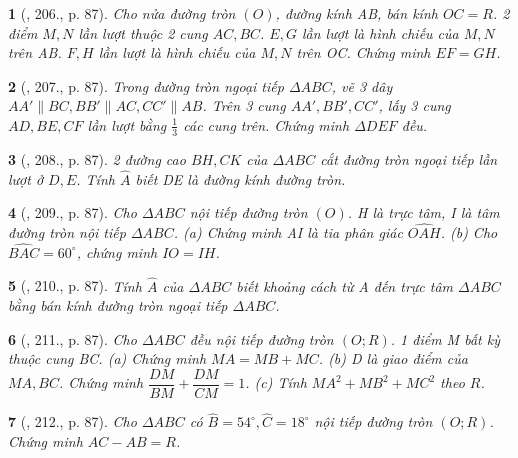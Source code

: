 \documentclass{article}
\newtheorem{baitoan}{}
\begin{document}
\begin{baitoan}[\cite{Binh_Toan_9_tap_2}, 206., p. 87]
	Cho nửa đường tròn $(O)$, đường kính AB, bán kính $OC = R$. 2 điểm $M,N$ lần lượt thuộc 2 cung $AC,BC$. $E,G$ lần lượt là hình chiếu của $M,N$ trên AB. $F,H$ lần lượt là hình chiếu của $M,N$ trên OC. Chứng minh $EF = GH$.
\end{baitoan}

\begin{baitoan}[\cite{Binh_Toan_9_tap_2}, 207., p. 87]
	Trong đường tròn ngoại tiếp $\Delta ABC$, vẽ 3 dây $AA'\parallel BC,BB'\parallel AC,CC'\parallel AB$. Trên 3 cung $AA',BB',CC'$, lấy 3 cung $AD,BE,CF$ lần lượt bằng $\frac{1}{3}$ các cung trên. Chứng minh $\Delta DEF$ đều.
\end{baitoan}

\begin{baitoan}[\cite{Binh_Toan_9_tap_2}, 208., p. 87]
	2 đường cao $BH,CK$ của $\Delta ABC$ cắt đường tròn ngoại tiếp lần lượt ở $D,E$. Tính $\widehat{A}$ biết DE là đường kính đường tròn.
\end{baitoan}

\begin{baitoan}[\cite{Binh_Toan_9_tap_2}, 209., p. 87]
	Cho $\Delta ABC$ nội tiếp đường tròn $(O)$. H là trực tâm, I là tâm đường tròn nội tiếp $\Delta ABC$. (a) Chứng minh AI là tia phân giác $\widehat{OAH}$. (b) Cho $\widehat{BAC} = 60^\circ$, chứng minh $IO = IH$.
\end{baitoan}

\begin{baitoan}[\cite{Binh_Toan_9_tap_2}, 210., p. 87]
	Tính $\widehat{A}$ của $\Delta ABC$ biết khoảng cách từ A đến trực tâm $\Delta ABC$ bằng bán kính đường tròn ngoại tiếp $\Delta ABC$.
\end{baitoan}

\begin{baitoan}[\cite{Binh_Toan_9_tap_2}, 211., p. 87]
	Cho $\Delta ABC$ đều nội tiếp đường tròn $(O;R)$. 1 điểm M bất kỳ thuộc cung BC. (a) Chứng minh $MA = MB + MC$. (b) D là giao điểm của $MA,BC$. Chứng minh $\dfrac{DM}{BM}  + \dfrac{DM}{CM} = 1$. (c) Tính $MA^2 + MB^2 + MC^2$ theo $R$.
\end{baitoan}

\begin{baitoan}[\cite{Binh_Toan_9_tap_2}, 212., p. 87]
	Cho $\Delta ABC$ có $\widehat{B} = 54^\circ,\widehat{C} = 18^\circ$ nội tiếp đường tròn $(O;R)$. Chứng minh $AC - AB = R$.
\end{baitoan}
\end{document}
